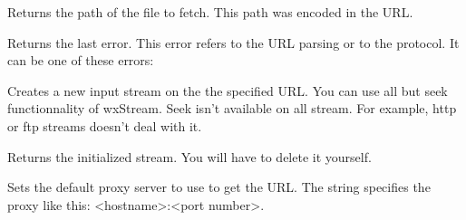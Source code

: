 
Returns the path of the file to fetch. This path was encoded in the URL.

%
%


Returns the last error. This error refers to the URL parsing or to the protocol.
It can be one of these errors:

\twocolwidtha{7cm}
\begin{twocollist}\itemsep=0pt%
\end{twocollist}%

%
%


Creates a new input stream on the the specified URL. You can use all but seek
functionnality of wxStream. Seek isn't available on all stream. For example,
http or ftp streams doesn't deal with it.


Returns the initialized stream. You will have to delete it yourself.



%
%
\label{wxurlsetdefaultproxy}


Sets the default proxy server to use to get the URL. The string specifies
the proxy like this: <hostname>:<port number>.





